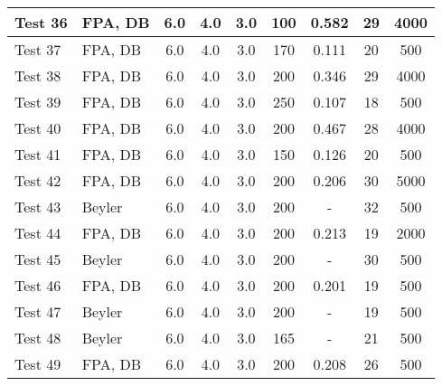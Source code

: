 \begin{table}[!ht]
\begin{center}
\begin{tabular}{|l|l|c|c|c|c|c|c|c|}
Test 36    &  FPA, DB           &  6.0       &  4.0       &  3.0       &  100            &  0.582          &  29                &  4000            \\ \hline
Test 37    &  FPA, DB           &  6.0       &  4.0       &  3.0       &  170            &  0.111          &  20                &  500             \\ \hline
Test 38    &  FPA, DB           &  6.0       &  4.0       &  3.0       &  200            &  0.346          &  29                &  4000            \\ \hline
Test 39    &  FPA, DB           &  6.0       &  4.0       &  3.0       &  250            &  0.107          &  18                &  500             \\ \hline
Test 40    &  FPA, DB           &  6.0       &  4.0       &  3.0       &  200            &  0.467          &  28                &  4000            \\ \hline
Test 41    &  FPA, DB           &  6.0       &  4.0       &  3.0       &  150            &  0.126          &  20                &  500             \\ \hline
Test 42    &  FPA, DB           &  6.0       &  4.0       &  3.0       &  200            &  0.206          &  30                &  5000            \\ \hline
Test 43    &  Beyler            &  6.0       &  4.0       &  3.0       &  200            &  -              &  32                &  500             \\ \hline
Test 44    &  FPA, DB           &  6.0       &  4.0       &  3.0       &  200            &  0.213          &  19                &  2000            \\ \hline
Test 45    &  Beyler            &  6.0       &  4.0       &  3.0       &  200            &  -              &  30                &  500             \\ \hline
Test 46    &  FPA, DB           &  6.0       &  4.0       &  3.0       &  200            &  0.201          &  19                &  500             \\ \hline
Test 47    &  Beyler            &  6.0       &  4.0       &  3.0       &  200            &  -              &  19                &  500             \\ \hline
Test 48    &  Beyler            &  6.0       &  4.0       &  3.0       &  165            &  -              &  21                &  500             \\ \hline
Test 49    &  FPA, DB           &  6.0       &  4.0       &  3.0       &  200            &  0.208          &  26                &  500             \\ \hline

\end{tabular}
\end{center}
\end{table}
